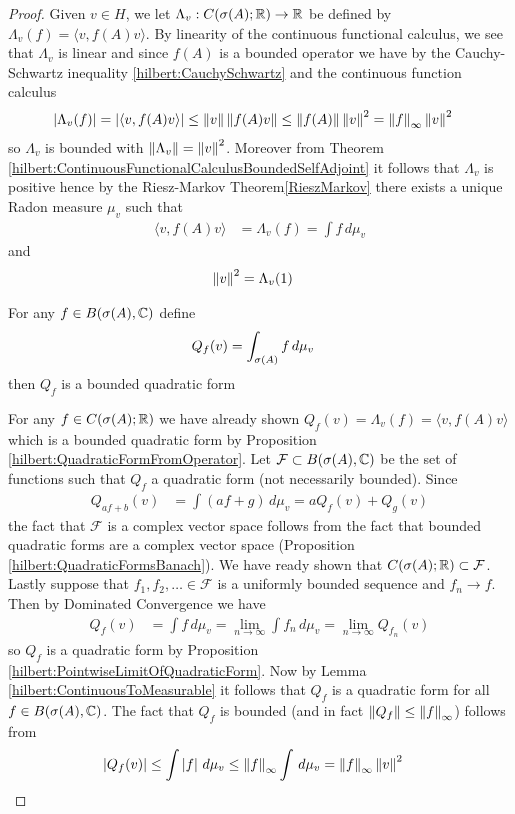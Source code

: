 \begin{proof}
Given $v \in H$, we let $\Lambda_v : C(\sigma(A); \mathbb{R}) \to \mathbb{R}$ be defined by $\Lambda_v(f) = \langle v, f(A) v \rangle$.  By linearity of the continuous functional calculus, we see that $\Lambda_v$ is linear and since $f(A)$ is a bounded operator we have by the Cauchy-Schwartz inequality \ref{hilbert:CauchySchwartz} and the continuous function calculus
\begin{align*}
\left \vert \Lambda_v(f) \right \vert &=\left \vert \langle v, f(A) v \rangle \right \vert \leq \left \lVert v \right \rVert \left \lVert f(A) v \right \rVert \leq \left \lVert f(A) \right \rVert \left \lVert v \right \rVert^2 = \left \lVert f \right \rVert_\infty \left \lVert v \right \rVert^2
\end{align*}
so $\Lambda_v$ is bounded with $\left \lVert \Lambda_v \right \rVert = \left \lVert v \right \rVert^2$.  Moreover from Theorem \ref{hilbert:ContinuousFunctionalCalculusBoundedSelfAdjoint} it follows that $\Lambda_v$ is positive hence by the Riesz-Markov Theorem\ref{RieszMarkov} there exists a unique Radon measure $\mu_v$ such that 
\begin{align*}
\langle v, f(A) v \rangle &= \Lambda_v(f) = \int f \, d\mu_v
\end{align*}
and
\begin{align*}
\left \lVert v \right \rVert^2 &= \Lambda_v(1) 
\end{align*}
\begin{clm}For any $f \in B(\sigma(A), \mathbb{C})$ define
\begin{align*}
Q_f(v) &= \int_{\sigma(A)} f \, d\mu_v
\end{align*}
then $Q_f$ is a bounded quadratic form
\end{clm}
For any $f \in C(\sigma(A); \mathbb{R})$ we have already shown $Q_f(v) = \Lambda_v(f) = \langle v, f(A) v \rangle$ which is a bounded
quadratic form by Proposition \ref{hilbert:QuadraticFormFromOperator}.  Let $\mathcal{F} \subset B(\sigma(A), \mathbb{C})$
be the set of functions such that $Q_f$ a quadratic form (not necessarily bounded).  Since
\begin{align*}
Q_{af +b}(v) &= \int (a f +g ) \, d\mu_v = a Q_f(v) + Q_g(v)
\end{align*}
the fact that $\mathcal{F}$ is a complex vector space follows from the
fact that bounded quadratic forms are a complex vector space (Proposition \ref{hilbert:QuadraticFormsBanach}).  We have ready shown that $C(\sigma(A); \mathbb{R}) \subset \mathcal{F}$.  Lastly suppose that $f_1, f_2, \dotsc \in \mathcal{F}$ is a uniformly bounded sequence and $f_n \to f$.  Then by Dominated Convergence we have
\begin{align*}
Q_f(v) &= \int f \, d\mu_v = \lim_{n \to \infty} \int f_n \, d\mu_v = \lim_{n \to \infty} Q_{f_n}(v) 
\end{align*}
so $Q_f$ is a quadratic form by Proposition \ref{hilbert:PointwiseLimitOfQuadraticForm}.  Now by Lemma \ref{hilbert:ContinuousToMeasurable} it follows that $Q_f$ is a quadratic form for all $f \in B(\sigma(A), \mathbb{C})$.  The fact that $Q_f$ is bounded (and in fact $\left \lVert Q_f \right \rVert \leq \left \lVert f \right \rVert_\infty$) follows from
\begin{align*}
\left \vert Q_f(v) \right \vert &\leq \int \left \vert f \right \vert \, d\mu_v \leq \left \lVert f \right \rVert_\infty \int \, d\mu_v = \left \lVert f \right \rVert_\infty \left \lVert v \right \rVert^2
\end{align*}


\end{proof}
